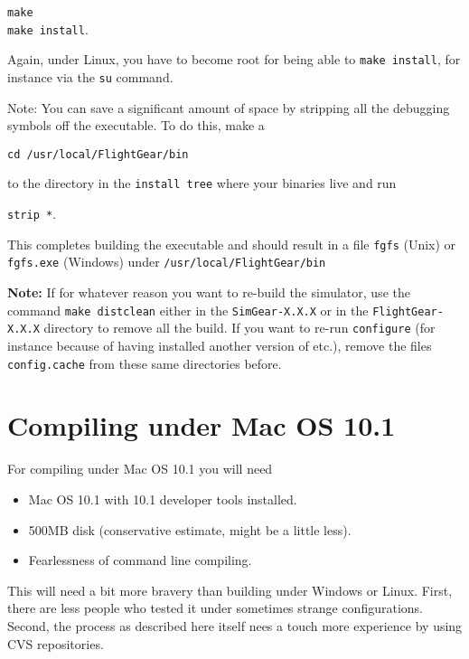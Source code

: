 \begin{enumerate}
        \texttt{make}\\
        \texttt{make install}.

 \noindent
 Again, under Linux, you have to become root for being able to \texttt{make
install}, for instance via the \texttt{su} command.

 \noindent
 Note:  You can save a significant amount of space by stripping all the
    debugging symbols off the executable.  To do this, make a
     \medskip

    \texttt{cd /usr/local/FlightGear/bin}

 \noindent
    to the directory in the \texttt{install tree} where your binaries live and run
     \medskip

    \texttt{strip *}.
  \end{enumerate}


 This completes building the executable and should result in a file \texttt{fgfs} (Unix) or
 \texttt{fgfs.exe} (Windows) under \texttt{/usr/local/FlightGear/bin}

\textbf{Note:} If for whatever reason you want to re-build the simulator, use the command
\texttt{make distclean} either in the \texttt{SimGear-X.X.X} or in the
\texttt{FlightGear-X.X.X} directory to remove all the build. If you want to re-run
\texttt{configure} (for instance because of having installed another version of \PLIB{}
etc.), remove the files \texttt{config.cache} from these same directories before.

\section{Compiling \FlightGear{} under Mac OS 10.1 }

For compiling under Mac OS 10.1 you will need

\begin{itemize}
\item Mac OS 10.1 with 10.1 developer tools installed.
\item 500MB disk (conservative estimate, might be a little less).
\item Fearlessness of command line compiling.
\end{itemize}

This will need a bit more bravery than building under Windows or Linux. First, there are less people who tested it under sometimes strange configurations. Second, the process as described here itself nees a touch more experience by using CVS repositories.


